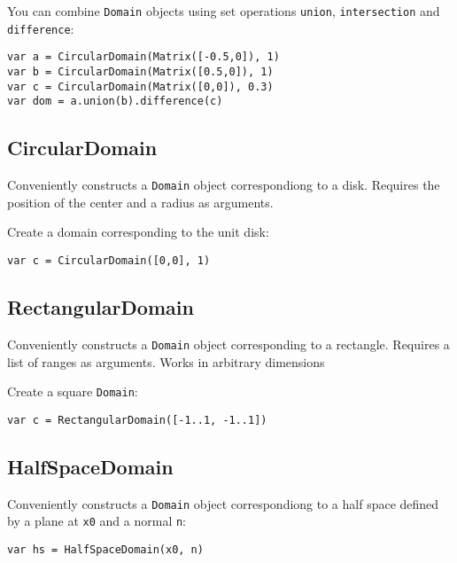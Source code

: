 You can combine \texttt{Domain} objects using set operations
\texttt{union}, \texttt{intersection} and \texttt{difference}:

\begin{lstlisting}
var a = CircularDomain(Matrix([-0.5,0]), 1)
var b = CircularDomain(Matrix([0.5,0]), 1)
var c = CircularDomain(Matrix([0,0]), 0.3)
var dom = a.union(b).difference(c)
\end{lstlisting}

\hypertarget{circulardomain}{%
\subsection{CircularDomain}\label{circulardomain}}

Conveniently constructs a \texttt{Domain} object correspondiong to a
disk. Requires the position of the center and a radius as arguments.

Create a domain corresponding to the unit disk:

\begin{lstlisting}
var c = CircularDomain([0,0], 1)
\end{lstlisting}

\hypertarget{rectangulardomain}{%
\subsection{RectangularDomain}\label{rectangulardomain}}

Conveniently constructs a \texttt{Domain} object corresponding to a
rectangle. Requires a list of ranges as arguments. Works in arbitrary
dimensions

Create a square \texttt{Domain}:

\begin{lstlisting}
var c = RectangularDomain([-1..1, -1..1])
\end{lstlisting}

\hypertarget{halfspacedomain}{%
\subsection{HalfSpaceDomain}\label{halfspacedomain}}

Conveniently constructs a \texttt{Domain} object correspondiong to a
half space defined by a plane at \texttt{x0} and a normal \texttt{n}:

\begin{lstlisting}
var hs = HalfSpaceDomain(x0, n)
\end{lstlisting}

